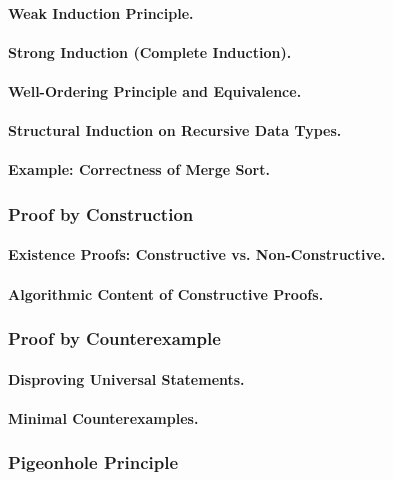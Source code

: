 \paragraph{Weak Induction Principle.}
\paragraph{Strong Induction (Complete Induction).}
\paragraph{Well-Ordering Principle and Equivalence.}
\paragraph{Structural Induction on Recursive Data Types.}
\paragraph{Example: Correctness of Merge Sort.}

\subsubsection{Proof by Construction}
\paragraph{Existence Proofs: Constructive vs. Non-Constructive.}
\paragraph{Algorithmic Content of Constructive Proofs.}

\subsubsection{Proof by Counterexample}
\paragraph{Disproving Universal Statements.}
\paragraph{Minimal Counterexamples.}

\subsubsection{Pigeonhole Principle}
